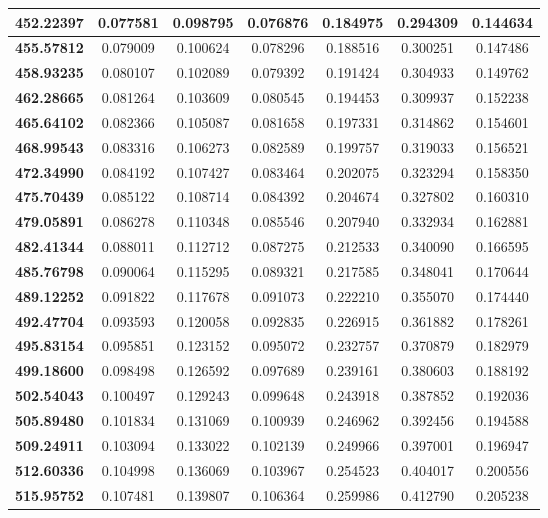 \documentclass[10pt, a4paper]{article}
\begin{document}
\begin{appendices}
\begin{longtable}{|c|c|c|c|c|c|c|}
	\textbf{452.22397} & 0.077581 & 0.098795 & 0.076876 & 0.184975 & 0.294309 & 0.144634 \\ \hline
	\textbf{455.57812} & 0.079009 & 0.100624 & 0.078296 & 0.188516 & 0.300251 & 0.147486 \\ \hline
	\textbf{458.93235} & 0.080107 & 0.102089 & 0.079392 & 0.191424 & 0.304933 & 0.149762 \\ \hline
	\textbf{462.28665} & 0.081264 & 0.103609 & 0.080545 & 0.194453 & 0.309937 & 0.152238 \\ \hline
	\textbf{465.64102} & 0.082366 & 0.105087 & 0.081658 & 0.197331 & 0.314862 & 0.154601 \\ \hline
	\textbf{468.99543} & 0.083316 & 0.106273 & 0.082589 & 0.199757 & 0.319033 & 0.156521 \\ \hline
	\textbf{472.34990} & 0.084192 & 0.107427 & 0.083464 & 0.202075 & 0.323294 & 0.158350 \\ \hline
	\textbf{475.70439} & 0.085122 & 0.108714 & 0.084392 & 0.204674 & 0.327802 & 0.160310 \\ \hline
	\textbf{479.05891} & 0.086278 & 0.110348 & 0.085546 & 0.207940 & 0.332934 & 0.162881 \\ \hline
	\textbf{482.41344} & 0.088011 & 0.112712 & 0.087275 & 0.212533 & 0.340090 & 0.166595 \\ \hline
	\textbf{485.76798} & 0.090064 & 0.115295 & 0.089321 & 0.217585 & 0.348041 & 0.170644 \\ \hline
	\textbf{489.12252} & 0.091822 & 0.117678 & 0.091073 & 0.222210 & 0.355070 & 0.174440 \\ \hline
	\textbf{492.47704} & 0.093593 & 0.120058 & 0.092835 & 0.226915 & 0.361882 & 0.178261 \\ \hline
	\textbf{495.83154} & 0.095851 & 0.123152 & 0.095072 & 0.232757 & 0.370879 & 0.182979 \\ \hline
	\textbf{499.18600} & 0.098498 & 0.126592 & 0.097689 & 0.239161 & 0.380603 & 0.188192 \\ \hline
	\textbf{502.54043} & 0.100497 & 0.129243 & 0.099648 & 0.243918 & 0.387852 & 0.192036 \\ \hline
	\textbf{505.89480} & 0.101834 & 0.131069 & 0.100939 & 0.246962 & 0.392456 & 0.194588 \\ \hline
	\textbf{509.24911} & 0.103094 & 0.133022 & 0.102139 & 0.249966 & 0.397001 & 0.196947 \\ \hline
	\textbf{512.60336} & 0.104998 & 0.136069 & 0.103967 & 0.254523 & 0.404017 & 0.200556 \\ \hline
	\textbf{515.95752} & 0.107481 & 0.139807 & 0.106364 & 0.259986 & 0.412790 & 0.205238 \\ \hline

\end{longtable}
\end{appendices}
\end{document}
